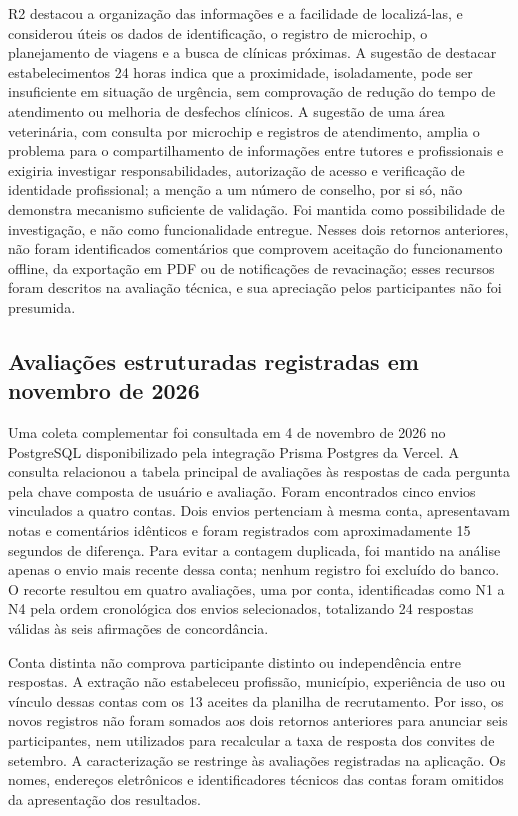 \documentclass{UNESC}
\begin{document}
R2 destacou a organização das informações e a facilidade de localizá-las, e considerou úteis os dados de identificação, o registro de microchip, o planejamento de viagens e a busca de clínicas próximas. A sugestão de destacar estabelecimentos 24 horas indica que a proximidade, isoladamente, pode ser insuficiente em situação de urgência, sem comprovação de redução do tempo de atendimento ou melhoria de desfechos clínicos. A sugestão de uma área veterinária, com consulta por microchip e registros de atendimento, amplia o problema para o compartilhamento de informações entre tutores e profissionais e exigiria investigar responsabilidades, autorização de acesso e verificação de identidade profissional; a menção a um número de conselho, por si só, não demonstra mecanismo suficiente de validação. Foi mantida como possibilidade de investigação, e não como funcionalidade entregue. Nesses dois retornos anteriores, não foram identificados comentários que comprovem aceitação do funcionamento offline, da exportação em PDF ou de notificações de revacinação; esses recursos foram descritos na avaliação técnica, e sua apreciação pelos participantes não foi presumida.

\subsection{Avaliações estruturadas registradas em novembro de 2026}
\label{sec:feedbacks_novembro}

Uma coleta complementar foi consultada em 4 de novembro de 2026 no PostgreSQL disponibilizado pela integração Prisma Postgres da Vercel. A consulta relacionou a tabela principal de avaliações às respostas de cada pergunta pela chave composta de usuário e avaliação. Foram encontrados cinco envios vinculados a quatro contas. Dois envios pertenciam à mesma conta, apresentavam notas e comentários idênticos e foram registrados com aproximadamente 15 segundos de diferença. Para evitar a contagem duplicada, foi mantido na análise apenas o envio mais recente dessa conta; nenhum registro foi excluído do banco. O recorte resultou em quatro avaliações, uma por conta, identificadas como N1 a N4 pela ordem cronológica dos envios selecionados, totalizando 24 respostas válidas às seis afirmações de concordância.

Conta distinta não comprova participante distinto ou independência entre respostas. A extração não estabeleceu profissão, município, experiência de uso ou vínculo dessas contas com os 13 aceites da planilha de recrutamento. Por isso, os novos registros não foram somados aos dois retornos anteriores para anunciar seis participantes, nem utilizados para recalcular a taxa de resposta dos convites de setembro. A caracterização se restringe às avaliações registradas na aplicação. Os nomes, endereços eletrônicos e identificadores técnicos das contas foram omitidos da apresentação dos resultados.
\end{document}
